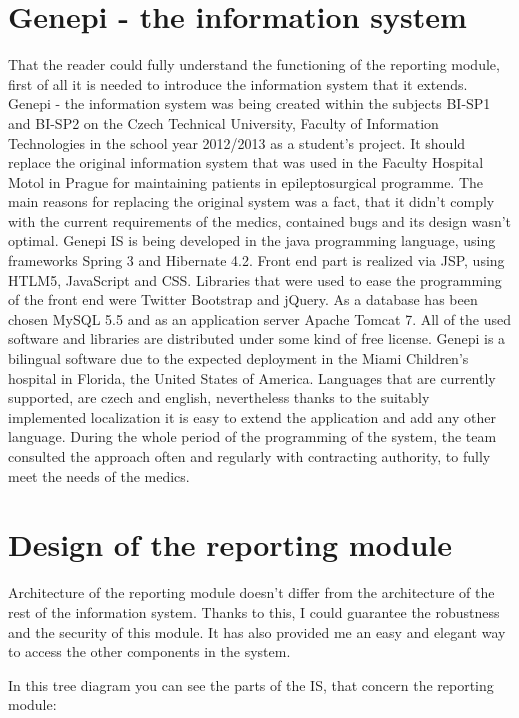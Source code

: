 \documentclass[thesis=B,english]{FITthesis}[2012/10/20]
\begin{document}
\section{Genepi - the information system}
That the reader could fully understand the functioning of the reporting module, first of all it is needed to introduce the information system that it extends. Genepi - the information system was being created within the subjects BI-SP1 and BI-SP2 on the Czech Technical University, Faculty of Information Technologies in the school year 2012/2013 as a student's project. It should replace the original information system that was used in the Faculty Hospital Motol in Prague for maintaining patients in epileptosurgical programme. The main reasons for replacing the original system was a fact, that it didn't comply with the current requirements of the medics, contained bugs and its design wasn't optimal. Genepi IS is being developed in the java programming language, using frameworks Spring 3 and Hibernate 4.2. Front end part is realized via JSP, using HTLM5, JavaScript and CSS. Libraries that were used to ease the programming of the front end were Twitter Bootstrap and jQuery. As a database has been chosen MySQL 5.5 and as an application server Apache Tomcat 7. All of the used software and libraries are distributed under some kind of free license. Genepi is a bilingual software due to the expected deployment in the Miami Children's hospital in Florida, the United States of America. Languages that are currently supported, are czech and english, nevertheless thanks to the suitably implemented localization it is easy to extend the application and add any other language. During the whole period of the programming of the system, the team consulted the approach often  and regularly with contracting authority, to fully meet the needs of the medics.

\section{Design of the reporting module}
Architecture of the reporting module doesn't differ from the architecture of the rest of the information system. Thanks to this, I could guarantee the robustness and the security of this module. It has also provided me an easy and elegant way to access the other components in the system.



In this tree diagram you can see the parts of the IS, that concern the reporting module:
\end{document}
